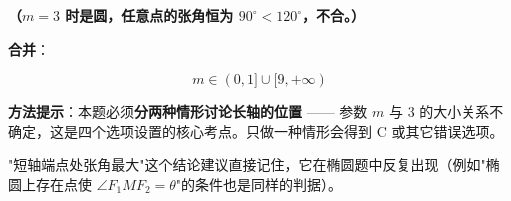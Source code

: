 \begin{answer}
\textbf{（$m=3$ 时是圆，任意点的张角恒为 $90^\circ<120^\circ$，不合。）}

\textbf{合并}：

\nopagebreak[4]
\[m\in(0,1]\cup[9,+\infty)\]

\begin{gktip}
\textbf{方法提示}：本题必须\textbf{分两种情形讨论长轴的位置} —— 参数 $m$ 与 $3$ 的大小关系不确定，这是四个选项设置的核心考点。只做一种情形会得到 C 或其它错误选项。

"短轴端点处张角最大"这个结论建议直接记住，它在椭圆题中反复出现（例如"椭圆上存在点使 $\angle F_1MF_2=\theta$"的条件也是同样的判据）。
\end{gktip}

\gkanswer{答案：A（$(0,1]\cup[9,+\infty)$）}

\par\medskip

\end{answer}

